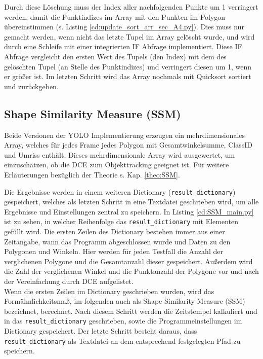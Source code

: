 {	\fi Durch diese Löschung muss der Index aller nachfolgenden Punkte um 1 verringert werden, damit die Punktindizes im Array mit den Punkten im Polygon übereinstimmen \ifimportant (s. Listing \ref{cd:update_sort_arr_sec_A4.py})\fi. Dies muss nur gemacht werden, wenn nicht das letzte Tupel im Array gelöscht wurde, und wird durch eine Schleife mit einer integrierten IF Abfrage implementiert. Diese IF Abfrage vergleicht den ersten Wert des Tupels (den Index) mit dem des gelöschten Tupel (an Stelle des Punktindizes) und verringert diesen um 1, wenn er größer ist.
	Im letzten Schritt wird das Array nochmals mit Quicksort sortiert und zurückgeben.
	
}


\subsection{Shape Similarity Measure (SSM)}{
	\label{py:Shape_Sim_Meas}
	Beide Versionen der YOLO Implementierung erzeugen ein mehrdimensionales Array, welches für jedes Frame jedes Polygon mit Gesamtwinkelsumme, ClassID und Umriss enthält. Dieses mehrdimensionale Array wird ausgewertet, um einzuschätzen, ob die DCE zum Objekttracking geeignet ist. Für weitere Erläuterungen bezüglich der Theorie s. Kap. \ref{theo:SSM}. \\
	\ifimportant
	
	\fi

	Die Ergebnisse werden in einem weiteren Dictionary (\lstinline|result_dictionary|) gespeichert, welches als letzten Schritt in eine Textdatei geschrieben wird, um alle Ergebnisse und Einstellungen zentral zu speichern. \ifimportant In Listing \ref{cd:SSM_main.py} ist zu sehen, in welcher Reihenfolge das \lstinline|result_dictionary| mit Elementen gefüllt wird. \fi Die ersten Zeilen des Dictionary bestehen immer aus einer Zeitangabe, wann das Programm abgeschlossen wurde und Daten zu den Polygonen und Winkeln. Hier werden für jeden Testfall die Anzahl der verglichenen Polygone und die Gesamtanzahl dieser gespeichert. Außerdem wird die Zahl der verglichenen Winkel und die Punktanzahl der Polygone vor und nach der Vereinfachung durch DCE aufgelistet. \\
	Wenn die ersten Zeilen im Dictionary geschrieben wurden, wird das Formähnlichkeitsmaß, im folgenden auch als \glqq Shape Similarity Measure\grqq{} (SSM) bezeichnet, berechnet. Nach diesem Schritt werden die Zeitstempel kalkuliert und in das \lstinline|result_dictionary| geschrieben, sowie die Programmeinstellungen im Dictionary gespeichert. Der letzte Schritt besteht daraus, dass \lstinline|result_dictionary| als Textdatei an dem entsprechend festgelegten Pfad zu speichern. \\
	\ifimportant
	 
	\fi

}
